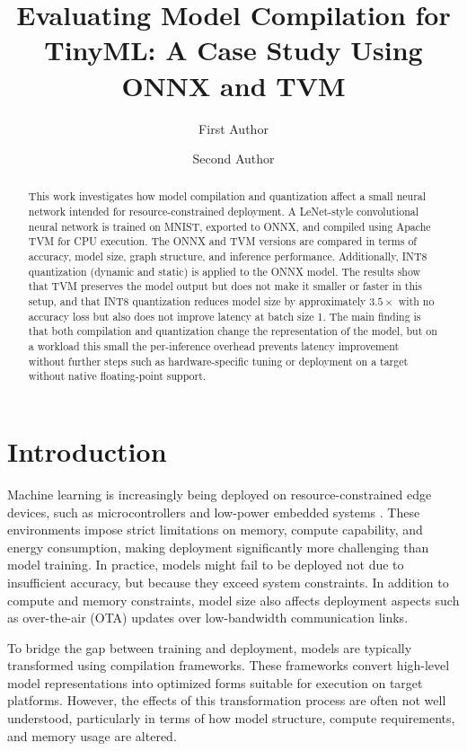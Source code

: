 \documentclass[fleqn,10pt]{olplainarticle}
\title{Evaluating Model Compilation for TinyML: A Case Study Using ONNX and TVM}
\author[1]{First Author}
\author[2]{Second Author}
\affil[1]{Address of first author}
\affil[2]{Address of second author}
\begin{document}
\flushbottom
\maketitle

\begin{abstract}
This work investigates how model compilation and quantization affect a small neural network intended for resource-constrained deployment. A LeNet-style convolutional neural network is trained on MNIST, exported to ONNX, and compiled using Apache TVM for CPU execution. The ONNX and TVM versions are compared in terms of accuracy, model size, graph structure, and inference performance. Additionally, INT8 quantization (dynamic and static) is applied to the ONNX model. The results show that TVM preserves the model output but does not make it smaller or faster in this setup, and that INT8 quantization reduces model size by approximately $3.5\times$ with no accuracy loss but also does not improve latency at batch size 1. The main finding is that both compilation and quantization change the representation of the model, but on a workload this small the per-inference overhead prevents latency improvement without further steps such as hardware-specific tuning or deployment on a target without native floating-point support.
\end{abstract}

\thispagestyle{empty}
\section{Introduction}

Machine learning is increasingly being deployed on resource-constrained edge devices, such as microcontrollers and low-power embedded systems \cite{banbury2020tinyml}. These environments impose strict limitations on memory, compute capability, and energy consumption, making deployment significantly more challenging than model training. In practice, models might fail to be deployed not due to insufficient accuracy, but because they exceed system constraints. In addition to compute and memory constraints, model size also affects deployment aspects such as over-the-air (OTA) updates over low-bandwidth communication links.

To bridge the gap between training and deployment, models are typically transformed using compilation frameworks. These frameworks convert high-level model representations into optimized forms suitable for execution on target platforms. However, the effects of this transformation process are often not well understood, particularly in terms of how model structure, compute requirements, and memory usage are altered.
\end{document}
